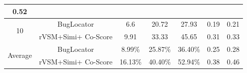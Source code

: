 \documentclass{sig-alternate}
\begin{document}
\begin{table}[]
\begin{tabular}{@{}|c|c|c|c|c|c|c|@{}}
		0.52    \\  \midrule
		\multirow{2}{*}{10}  &BugLocator     &  6.6& 20.72&27.93& 0.19 & 0.21 \\ 
		& rVSM+Simi+ Co-Score
		&9.91 &
		33.33 &
		45.65 & 0.31 &
		0.33    \\  \midrule
		\multirow{2}{*}{Average}       &BugLocator     &  8.99\%& 25.87\%&36.40\%& 0.25 & 0.28  \\ 
		& rVSM+Simi+ Co-Score                                                                                                                         & 16.13\%                                                 & 40.40\%                                                 & 52.94\%                                                  &   0.38  &  0.46    \\ \bottomrule
		
	\end{tabular}
\end{table}
\end{document}
